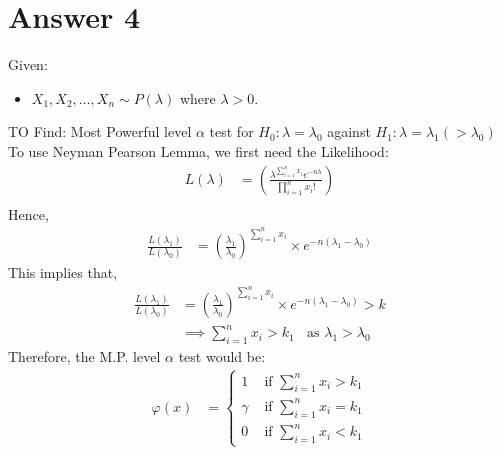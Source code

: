 \documentclass[a4paper]{article}
\begin{document}
\section{Answer 4}
Given:
\begin{itemize}
	\item {$X_1,X_2,\dots,X_n \sim P\left( \lambda \right) $ where $\lambda > 0$.}
\end{itemize}
TO Find: Most Powerful level $\alpha$ test for $H_0 : \lambda = \lambda_0$ against $H_1 : \lambda = \lambda_1 \left( >\lambda_0 \right)$
\newline\newline
To use Neyman Pearson Lemma, we first need the Likelihood:
\begin{equation*}
	\begin{split}
	L\left( \lambda \right) &= \left(\frac{\lambda^{\sum_{i=1}^{n} x_i}e^{-n\lambda}}{\prod_{i=1}^{n} x_i! } \right)\\
	\end{split}
\end{equation*}
Hence, 
\begin{equation*}
	\begin{split}
		\frac{L\left( \lambda_1 \right) }{L\left( \lambda_0 \right) }  &= \left( \frac{\lambda_1}{\lambda_0} \right) ^{\sum_{i=1}^{n} x_i} \times e^{-n\left( \lambda_1-\lambda_0 \right) }
	\end{split}
\end{equation*}
This implies that,
\begin{equation*}
	\begin{split}
		\frac{L\left( \lambda_1 \right) }{L\left( \lambda_0 \right) } &= \left( \frac{\lambda_1}{\lambda_0} \right) ^{\sum_{i=1}^{n} x_i} \times e^{-n\left( \lambda_1-\lambda_0 \right) } > k\\
		&\implies \sum_{i=1}^{n} x_i > k_1 \;\; \text{ as $\lambda_1 > \lambda_0$}
	\end{split}
\end{equation*}
Therefore, the M.P. level $\alpha$ test would be:
\begin{equation*}
	\begin{split}
		\varphi\left( x \right) &= \begin{cases}
			1 & \text{ if } \sum_{i=1}^{n} x_i > k_1\\
			\gamma & \text{ if } \sum_{i=1}^{n} x_i = k_1\\
			0 & \text{ if } \sum_{i=1}^{n} x_i <k_1
		\end{cases}
	\end{split}
\end{equation*}
\end{document}

